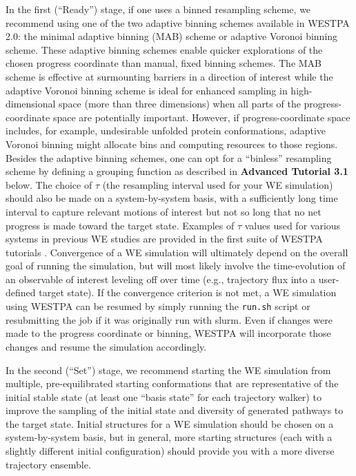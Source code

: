 In the first (“Ready”) stage, if one uses a binned resampling scheme, we recommend using one of the two adaptive binning schemes available in WESTPA 2.0: the minimal adaptive binning (MAB) scheme or adaptive Voronoi binning scheme.
These adaptive binning schemes enable quicker explorations of the chosen progress coordinate than manual, fixed binning schemes. 
The MAB scheme is effective at surmounting barriers in a direction of interest \citep{torrillo_minimal_2021} while the adaptive Voronoi binning scheme \citep{zhang_exact_2010} is ideal for enhanced sampling in high-dimensional space (more than three dimensions) when all parts of the progress-coordinate space are potentially important. 
However, if progress-coordinate space includes, for example, undesirable unfolded protein conformations, adaptive Voronoi binning might allocate bins and computing resources to those regions. 
Besides the adaptive binning schemes, one can opt for a “binless” resampling scheme by defining a grouping function as described in \textbf{Advanced Tutorial 3.1} below. 
The choice of $\tau$ (the resampling interval used for your WE simulation) should also be made on a system-by-system basis, with a sufficiently long time interval to capture relevant motions of interest but not so long that no net progress is made toward the target state. 
Examples of $\tau$ values used for various systems in previous WE studies are provided in the first suite of WESTPA tutorials \citep{bogetti_suite_2019}. 
Convergence of a WE simulation will ultimately depend on the overall goal of running the simulation, but will most likely involve the time-evolution of an observable of interest leveling off over time (e.g., trajectory flux into a user-defined target state). 
If the convergence criterion is not met, a WE simulation using WESTPA can be resumed by simply running the \verb|run.sh| script or resubmitting the job if it was originally run with slurm. 
Even if changes were made to the progress coordinate or binning, WESTPA will incorporate those changes and resume the simulation accordingly.

In the second (“Set”) stage, we recommend starting the WE simulation from multiple, pre-equilibrated starting conformations that are representative of the initial stable state (at least one “basis state” for each trajectory walker) to improve the sampling of the initial state and diversity of generated pathways to the target state.
Initial structures for a WE simulation should be chosen on a system-by-system basis, but in general, more starting structures (each with a slightly different initial configuration) should provide you with a more diverse trajectory ensemble. 

